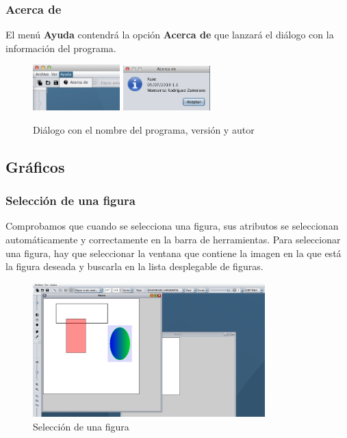 \subsubsection{Acerca de}
El menú \textbf{Ayuda} contendrá la opción \textbf{Acerca de} que lanzará el diálogo con la información del programa.
\vskip0.3cm
\begin{figure}[H]
 \centering
  \includegraphics[width=0.3\textwidth]{generales/ayuda2.png}
  \includegraphics[width=0.3\textwidth]{generales/ayuda1.png}
 \caption{Diálogo con el nombre del programa, versión y autor}
 \label{diseño}
 \end{figure}
\subsection{Gráficos}
\subsubsection{Selección de una figura}
Comprobamos que cuando se selecciona una figura, sus atributos se seleccionan automáticamente y correctamente en la barra de herramientas. Para seleccionar una figura, hay que seleccionar la ventana que contiene la imagen en la que está la figura deseada y buscarla en la lista desplegable de figuras.
\vskip0.3cm
\begin{figure}[H]
 \centering
  \includegraphics[width=0.8\textwidth]{graficos/seleccionFigura.jpg}
 \caption{Selección de una figura}
 \label{diseño}
 \end{figure}
